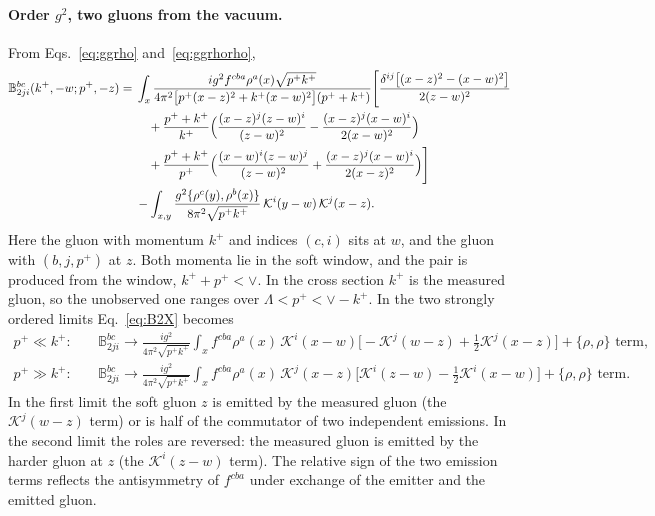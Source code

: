 \documentclass[aps,prd,onecolumn,superscriptaddress,nofootinbib,floatfix,longbibliography,11pt]{revtex4-2}
\numberwithin{equation}{section}
\newcommand{\KK}{\mathcal{K}}
\def\mf#1{\mathbb{#1}}
\begin{document}
\paragraph*{Order $g^2$, two gluons from the vacuum.} From Eqs.~\eqref{eq:ggrho} and~\eqref{eq:ggrhorho},
\begin{align}
\mf B^{bc}_{2ji}(k^+,-w;p^+,-z)={}&\int_x\frac{ig^2f^{cba}\rho^a(x)\sqrt{p^+k^+}}{4\pi^2\big[p^+(x-z)^2+k^+(x-w)^2\big](p^++k^+)}\Bigg[\frac{\delta^{ij}\big[(x-z)^2-(x-w)^2\big]}{2(z-w)^2}\notag\\
&\quad+\frac{p^++k^+}{k^+}\Big(\frac{(x-z)^j(z-w)^i}{(z-w)^2}-\frac{(x-z)^j(x-w)^i}{2(x-w)^2}\Big)\notag\\
&\quad+\frac{p^++k^+}{p^+}\Big(\frac{(x-w)^i(z-w)^j}{(z-w)^2}+\frac{(x-z)^j(x-w)^i}{2(x-z)^2}\Big)\Bigg]\notag\\
&-\int_{x,y}\frac{g^2\{\rho^c(y),\rho^b(x)\}}{8\pi^2\sqrt{p^+k^+}}\,\KK^i(y-w)\,\KK^j(x-z).
\label{eq:B2X}
\end{align}
Here the gluon with momentum $k^+$ and indices $(c,i)$ sits at $w$, and the gluon with $(b,j,p^+)$ at $z$. Both momenta lie in the soft window, and the pair is produced from the window, $k^++p^+<\vee$. In the cross section $k^+$ is the measured gluon, so the unobserved one ranges over $\Lambda<p^+<\vee-k^+$. In the two strongly ordered limits Eq.~\eqref{eq:B2X} becomes
\begin{align}
p^+\ll k^+:\quad&\mf B^{bc}_{2ji}\to\frac{ig^2}{4\pi^2\sqrt{p^+k^+}}\int_xf^{cba}\rho^a(x)\,\KK^i(x-w)\Big[-\KK^j(w-z)+\tfrac12\KK^j(x-z)\Big]+\{\rho,\rho\}\text{ term},\label{eq:B2soft}\\
p^+\gg k^+:\quad&\mf B^{bc}_{2ji}\to\frac{ig^2}{4\pi^2\sqrt{p^+k^+}}\int_xf^{cba}\rho^a(x)\,\KK^j(x-z)\Big[\KK^i(z-w)-\tfrac12\KK^i(x-w)\Big]+\{\rho,\rho\}\text{ term}.\label{eq:B2hard}
\end{align}
In the first limit the soft gluon $z$ is emitted by the measured gluon (the $\KK^j(w-z)$ term) or is half of the commutator of two independent emissions. In the second limit the roles are reversed: the measured gluon is emitted by the harder gluon at $z$ (the $\KK^i(z-w)$ term). The relative sign of the two emission terms reflects the antisymmetry of $f^{cba}$ under exchange of the emitter and the emitted gluon.
\end{document}
